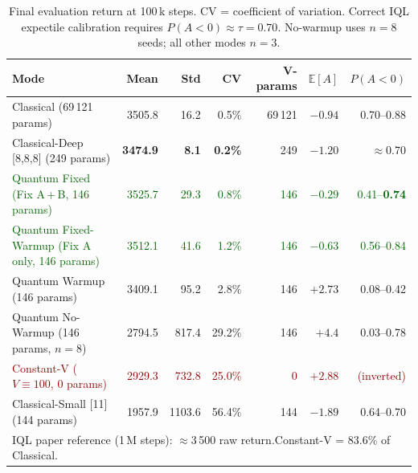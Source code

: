 \documentclass[10pt,a4paper]{article}
\begin{document}
\begin{table}[h]
\centering
\caption{Final evaluation return at 100\,k steps. CV = coefficient of
variation. Correct IQL expectile calibration requires
$P(A{<}0)\approx\tau=0.70$. No-warmup uses $n=8$ seeds; all other modes
$n=3$.}
\label{tab:returns}
\setlength{\tabcolsep}{5pt}
\begin{tabular}{lrrrrrr}
\toprule
\textbf{Mode} & \textbf{Mean} & \textbf{Std} & \textbf{CV} &
  \textbf{V-params} & $\mathbb{E}[A]$ & $P(A{<}0)$ \\
\midrule
Classical (69\,121 params)
  & 3505.8 & 16.2  & 0.5\%  & 69\,121 & $-0.94$ & 0.70--0.88 \\
Classical-Deep [8,8,8] (249 params)
  & \textbf{3474.9} & \textbf{8.1} & \textbf{0.2\%} & 249
  & $-1.20$ & $\approx$0.70 \\
\textcolor{darkgreen}{Quantum Fixed (Fix A\,+\,B, 146 params)}
  & \textcolor{darkgreen}{3525.7}
  & \textcolor{darkgreen}{29.3}
  & \textcolor{darkgreen}{0.8\%}
  & \textcolor{darkgreen}{146}
  & \textcolor{darkgreen}{$-0.29$}
  & \textcolor{darkgreen}{0.41--\textbf{0.74}} \\
\textcolor{darkgreen}{Quantum Fixed-Warmup (Fix A only, 146 params)}
  & \textcolor{darkgreen}{3512.1}
  & \textcolor{darkgreen}{41.6}
  & \textcolor{darkgreen}{1.2\%}
  & \textcolor{darkgreen}{146}
  & \textcolor{darkgreen}{$-0.63$}
  & \textcolor{darkgreen}{0.56--0.84} \\
Quantum Warmup (146 params)
  & 3409.1 & 95.2  & 2.8\%  & 146     & $+2.73$ & 0.08--0.42 \\
Quantum No-Warmup (146 params, $n{=}8$)
  & 2794.5 & 817.4 & 29.2\% & 146     & $+4.4$  & 0.03--0.78 \\
\textcolor{darkred}{Constant-V ($V\equiv100$, 0 params)}
  & \textcolor{darkred}{2929.3}
  & \textcolor{darkred}{732.8}
  & \textcolor{darkred}{25.0\%}
  & \textcolor{darkred}{0}
  & \textcolor{darkred}{$+2.88$}
  & \textcolor{darkred}{(inverted)} \\
Classical-Small [11] (144 params)
  & 1957.9 & 1103.6 & 56.4\% & 144    & $-1.89$ & 0.64--0.70 \\
\midrule
\multicolumn{7}{l}{\footnotesize IQL paper reference (1\,M steps):
  $\approx$3\,500 raw return.\quad Constant-V = 83.6\% of Classical.}\\
\bottomrule
\end{tabular}
\end{table}

\end{document}
